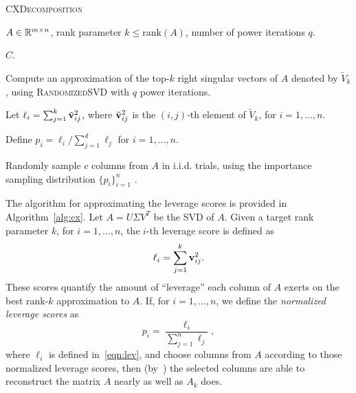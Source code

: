 \begin{algorithm}[tb]
 \caption{\textsc{CXDecomposition}}
  \label{alg:cx}
  \begin{algorithmic}[1]
    \Require $A \in \mathbb{R}^{m\times n}$, rank parameter $k \leq \textrm{rank}(A)$, number of power iterations $q$.

    \Ensure $C$.
    

    \State Compute an approximation of the top-$k$ right singular vectors of $A$ denoted by $\tilde V_k$, using \textsc{RandomizedSVD} with $q$ power iterations.
    
    \State Let $\ell_i = \sum_{j=1}^k \tilde {\mathbf{v}}_{ij}^2$, where $\tilde {\mathbf{v}}_{ij}^2$ is the $(i,j)$-th element of $\tilde V_k$, for $i = 1, \ldots, n$. 
    
    \State Define $p_i = \ell_i / \sum_{j=1}^d \ell_j$ for $i=1,\ldots,n$.
    
    \State Randomly sample $c$ columns from $A$ in i.i.d. trials, using the importance sampling distribution $\{p_i\}_{i=1}^n$ .

    

    \end{algorithmic}
\end{algorithm}

The algorithm for approximating the leverage scores is
provided in Algorithm~\ref{alg:cx}.
Let $A=U\Sigma V^T$ be the SVD of $A$.
Given a target rank parameter $k$, for $i=1,\ldots,n$, the $i$-th leverage score is defined as
\begin{equation}
 \label{eqn:lev}
  \ell_i = \sum_{j=1}^k \mathbf{v}_{ij}^2.
\end{equation}
These scores quantify the amount of ``leverage'' each column of $A$ exerts on the best rank-$k$ approximation to $A$. 
If, for $i=1,\ldots,n$, we define the {\it normalized leverage scores} as
\begin{equation}
\label{eqn:nlev}
  p_i = \frac{\ell_i}{\sum_{j=1}^n \ell_j},
\end{equation}      
where $\ell_i$ is defined in~\eqref{eqn:lev}, and choose columns from $A$
according to those normalized leverage scores, then (by~\cite{DMM08,CUR_PNAS})
the selected columns are able to reconstruct the matrix $A$ nearly as well as
$A_k$ does.

